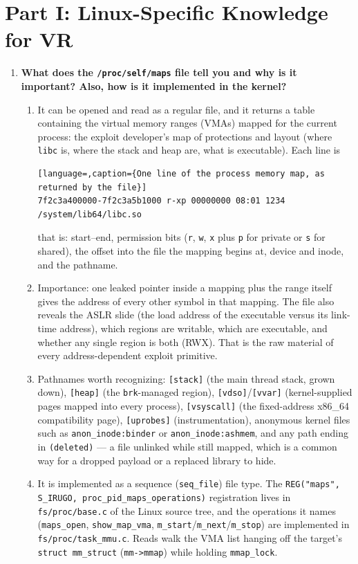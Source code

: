 \documentclass[12pt]{Training}
\begin{document}
\section*{Part I: Linux-Specific Knowledge for VR}
\begin{enumerate}
    \item \textbf{What does the \lstinline{/proc/self/maps} file tell you and why is it important? Also, how is it implemented in the kernel?}
    \begin{enumerate}
        \item It can be opened and read as a regular file, and it returns a table containing the virtual memory ranges (VMAs) mapped for the current process: the exploit developer's map of protections and layout (where \lstinline{libc} is, where the stack and heap are, what is executable). Each line is
        \begin{lstlisting}[language=,caption={One line of the process memory map, as returned by the file}]
7f2c3a400000-7f2c3a5b1000 r-xp 00000000 08:01 1234 /system/lib64/libc.so
        \end{lstlisting}
        that is: start--end, permission bits (\lstinline{r}, \lstinline{w}, \lstinline{x} plus \lstinline{p} for private or \lstinline{s} for shared), the offset into the file the mapping begins at, device and inode, and the pathname.
        \item Importance: one leaked pointer inside a mapping plus the range itself gives the address of every other symbol in that mapping. The file also reveals the ASLR slide (the load address of the executable versus its link-time address), which regions are writable, which are executable, and whether any single region is both (RWX). That is the raw material of every address-dependent exploit primitive.
        \item Pathnames worth recognizing: \lstinline{[stack]} (the main thread stack, grown down), \lstinline{[heap]} (the \lstinline{brk}-managed region), \lstinline{[vdso]}/\lstinline{[vvar]} (kernel-supplied pages mapped into every process), \lstinline{[vsyscall]} (the fixed-address x86\_64 compatibility page), \lstinline{[uprobes]} (instrumentation), anonymous kernel files such as \lstinline{anon_inode:binder} or \lstinline{anon_inode:ashmem}, and any path ending in \lstinline{(deleted)} --- a file unlinked while still mapped, which is a common way for a dropped payload or a replaced library to hide.
        \item It is implemented as a sequence (\lstinline{seq_file}) file type. The \lstinline{REG("maps", S_IRUGO, proc_pid_maps_operations)} registration lives in \lstinline{fs/proc/base.c} of the Linux source tree, and the operations it names (\lstinline{maps_open}, \lstinline{show_map_vma}, \lstinline{m_start}/\lstinline{m_next}/\lstinline{m_stop}) are implemented in \lstinline{fs/proc/task_mmu.c}. Reads walk the VMA list hanging off the target's \lstinline{struct mm_struct} (\lstinline{mm->mmap}) while holding \lstinline{mmap_lock}.

\end{enumerate}
\end{enumerate}
\end{document}
